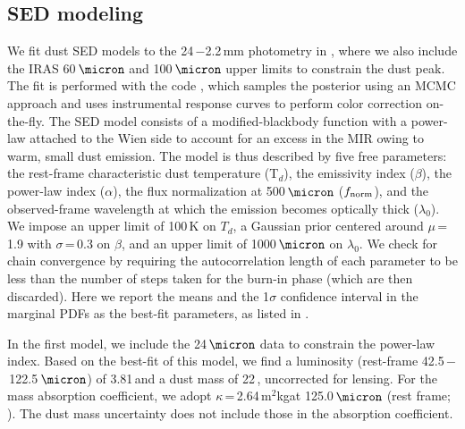 \documentclass[]{emulateapj}
\begin{document}
\subsection{SED modeling} \label{sec:SED}  %
We fit dust SED models to the
24\,\micron$-$2.2\,mm photometry in , where we also
include the IRAS 60\,$\micron$ and 100\,$\micron$ upper limits
to constrain the dust peak.
The fit is performed with the code
 \citep[\eg][]{Riechers13a,Dowell14a}, which samples the posterior
using an MCMC approach and uses instrumental
response curves to perform color correction on-the-fly.
The SED model consists of a modified-blackbody
function with a power-law attached to the
Wien side to account for an excess in the MIR owing to warm,
small dust emission.
%
The model is thus described by five free parameters: the rest-frame characteristic dust
temperature (T$_{d}$), the emissivity index ($\beta$), the power-law index
($\alpha$), the flux normalization at 500\,$\micron$ ($f_{\rm norm}$), and
the observed-frame wavelength at which the emission
becomes optically thick ($\lambda_{0}$). We impose
an upper limit of 100\,K on $T_d$, a Gaussian prior centered around
$\mu$\,=\,1.9 with $\sigma$\,=\,0.3 on $\beta$, and an upper limit of
1000\,$\micron$ on $\lambda_0$.
We check for chain convergence by requiring the autocorrelation
length of each parameter to be less than the number of steps
taken for the burn-in phase (which are then discarded).
Here we report the means %
and the 1$\sigma$ confidence interval in the marginal PDFs
as the best-fit parameters, as listed in .



In the first model, we include the 24\,$\micron$ data
to constrain the power-law index. Based on the
best-fit of this model, we find a
\fir luminosity (rest-frame 42.5\,$-$\,122.5\,$\micron$) of
3.81\,\Lsun and a
dust mass of 22\,\Msun, uncorrected for lensing.
For the mass absorption coefficient, we adopt
$\kappa$\,=\,2.64\,m$^2$kg\pmOne at 125.0\,$\micron$
(rest frame; \citealt{Dunne03a}).
The dust mass uncertainty does not
include those in the absorption coefficient.
\end{document}
